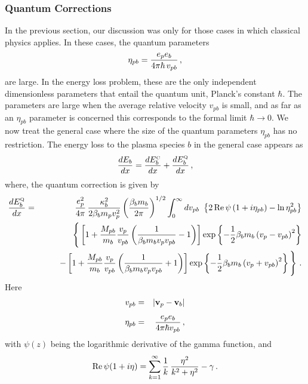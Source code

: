 \documentclass[preprint,12pt,eqsecnum,nofootinbib,amsmath,amssymb]{revtex4}
\newcommand{\smC}{{\rm\scriptscriptstyle C}}
\newcommand{\smQ}{{\rm\scriptscriptstyle Q}}
\begin{document}
\subsubsection{Quantum Corrections}

In the previous section, our discussion was only for 
those cases in which classical physics applies.  In 
these cases, the quantum parameters 
\begin{equation}
  \eta_{pb} = {e_p e_b \over 4 \pi \hbar\,v_{pb} } \,,
\end{equation}
are large.  In the energy loss problem, these are the only 
independent dimensionless parameters that entail the quantum 
unit, Planck's constant $\hbar$. The parameters are large 
when the average relative velocity $v_{pb}$ is small, and as 
far as an $\eta_{pb}$ parameter is concerned this corresponds 
to the formal limit $\hbar \to 0$. We now treat
the general case where the size of the quantum parameters 
$\eta_{pb}$ has no restriction. The energy loss to the 
plasma species $b$ in the general case appears as
\begin{equation}
  \frac{ dE_b }{dx} 
  = 
  \frac{ dE^\smC_b }{dx} 
  +
  \frac{ dE^\smQ_b }{dx} \,,
\end{equation}
where, the quantum correction is given by\cite{bps}
\begin{eqnarray}
  { d E^\smQ_b \over dx}  &=&
  { e_p^2 \over 4 \pi } \,
  { \kappa^2_b \over 2 \beta_b m_p v_p^2 }
  \left( { \beta_b m_b \over 2\pi } \right)^{1/2}
  \int_0^\infty dv_{pb} ~
  \left\{ 2\, {\rm Re} \, \psi \left( 1 + i \eta_{pb}
  \right) - \ln \eta^2_{pb}  \right\} 
\nonumber\\
  && \qquad
  \Bigg\{ \left[ 1 + {M_{pb} \over m_b} { v_p \over
  v_{pb} } \left( { 1 \over \beta_b m_b v_p v_{pb} } - 1
  \right) \right] \exp\left\{ - {1 
  \over 2} \beta_b m_b \left( v_p - v_{pb} \right)^2 
  \right\}
\nonumber\\
  && \qquad
  - \left[ 1 + {M_{pb} \over m_b} { v_p \over v_{pb} }
  \left( { 1 \over \beta_b m_b v_p v_{pb} } + 1 \right)
  \right]\exp\left\{- {1 \over 2} 
  \beta_b m_b \left( v_p +
  v_{pb} \right)^2\right\} \Bigg\} \ .
\label{quantumm}
\end{eqnarray}
Here 
\begin{eqnarray}
v_{pb} &=& | {\bf v}_p - {\bf v}_b| 
\\[5pt]
\eta_{pb} &=& { e_p e_b \over 4 \pi \hbar v_{pb} } \,,
\end{eqnarray}
with $\psi(z)$ being the logarithmic derivative 
of the gamma function, and
\begin{equation}
  {\rm Re} \, \psi(1+i\eta)  =
  \sum_{k=1}^\infty { 1 \over k}\, { \eta^2 \over k^2 +
  \eta^2 }  -\gamma \,.
\end{equation}
\end{document}

